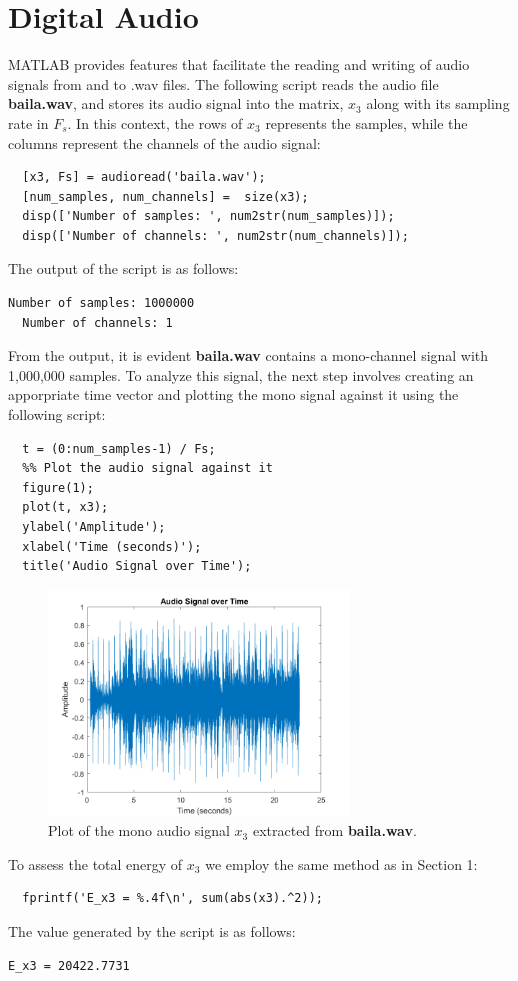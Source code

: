 \documentclass[a4paper, 10pt]{article}
\begin{document}
\section{Digital Audio}

MATLAB provides features that facilitate the reading and writing of audio signals from and to .wav files. 
The following script reads the audio file \textbf{baila.wav}, and stores its audio signal into the matrix,
$x_3$ along with its sampling rate in $F_s$. In this context, the rows of $x_3$ represents the samples, while
the columns represent the channels of the audio signal:
\begin{lstlisting}[style=Matlab-editor, basicstyle=\small\ttfamily]
  %% Read the audio file baila.wav
  [x3, Fs] = audioread('baila.wav');
  [num_samples, num_channels] =  size(x3);
  disp(['Number of samples: ', num2str(num_samples)]);
  disp(['Number of channels: ', num2str(num_channels)]);
\end{lstlisting}
The output of the script is as follows:
\begin{lstlisting}[basicstyle=\small\ttfamily]
  Number of samples: 1000000
  Number of channels: 1
\end{lstlisting}
From the output, it is evident \textbf{baila.wav} contains a mono-channel signal with 1,000,000 samples.
To analyze this signal, the next step involves creating an apporpriate time vector and plotting the mono signal
against it using the following script:
\begin{lstlisting}[style=Matlab-editor, basicstyle=\small\ttfamily]
  %% Create time vector
  t = (0:num_samples-1) / Fs;
  %% Plot the audio signal against it
  figure(1);
  plot(t, x3);
  ylabel('Amplitude');
  xlabel('Time (seconds)');
  title('Audio Signal over Time');
\end{lstlisting}
\begin{figure}[H]
  \centering
  \includegraphics[width=8cm]{images/x3_plot.png}
  \caption{Plot of the mono audio signal $x_3$ extracted from \textbf{baila.wav}.}
\end{figure}
To assess the total energy of $x_3$ we employ the same method as in Section 1:
\begin{lstlisting}[style=Matlab-editor, basicstyle=\small\ttfamily]
  %% Get total energy
  fprintf('E_x3 = %.4f\n', sum(abs(x3).^2));
\end{lstlisting}
The value generated by the script is as follows:
\begin{lstlisting}[basicstyle=\small\ttfamily]
  E_x3 = 20422.7731
\end{lstlisting}
\end{document}
